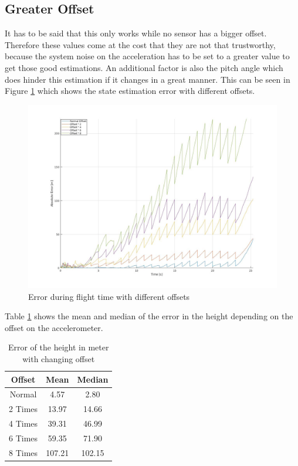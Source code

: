 \subsection{Greater Offset}
It has to be said that this only works while no sensor has a bigger offset.
Therefore these values come at the cost that they are not that trustworthy,
because the system noise on the acceleration has to be set to a greater value to get those good estimations.
An additional factor is also the pitch angle which does hinder this estimation if it changes in a great manner.
This can be seen in Figure \ref{fig:PointMassErrorWithOffset} which shows the state estimation error with different offsets.

\begin{figure}[h!]
 \centering
 \includegraphics[width=.8\textwidth]{./Pictures/PointMassErrorWithOffset.jpg}
 \caption{Error during flight time with different offsets}
 \label{fig:PointMassErrorWithOffset}
\end{figure}


Table \ref{tab:PointMassPerformanceWithOffset} shows the mean and median of the error in the height depending on the offset on the accelerometer.

\begin{table}[h!]
\centering
\begin{tabular}{ccc}
\hline
\multicolumn{1}{|c|}{Offset} & \multicolumn{1}{|c|}{Mean}& \multicolumn{1}{|c|}{Median} \\ \hline
%
Normal & 4.57 & 2.80\\
2 Times & 13.97 & 14.66\\
4 Times & 39.31 & 46.99\\
6 Times & 59.35 & 71.90\\
8 Times & 107.21 & 102.15
\end{tabular}
\caption{Error of the height in meter with changing offset}
\label{tab:PointMassPerformanceWithOffset}
\end{table}

